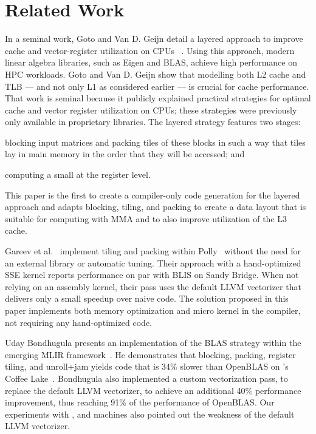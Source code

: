 \documentclass[\main/thesis.tex]{subfiles}
\begin{document}
\chapter{Related Work}
\label{cha:related}


In a seminal work, Goto and Van D. Geijn detail a layered approach to improve cache and vector-register utilization on CPUs ~\cite{goto2008}.
Using this approach, modern linear algebra libraries, such as Eigen and BLAS, achieve high performance on HPC workloads.
Goto and Van D. Geijn show that modelling both L2 cache and TLB --- and not only L1 as considered earlier --- is crucial for cache performance.
That work is seminal because it publicly explained practical strategies for optimal cache and vector register utilization on CPUs; these strategies were previously only available in proprietary libraries.
The layered strategy features two stages:
\begin{inparaenum}
  \item blocking input matrices and packing tiles of these blocks in such a way that tiles lay in main memory in the order that they will be accessed; and
  \item computing a small \gemm at the register level.
\end{inparaenum}
This paper is the first to create a compiler-only code generation for the layered approach and adapts blocking, tiling, and packing to create a data layout that is suitable for computing with MMA and to also improve utilization of the L3 cache.

Gareev et al.~\cite{GareevTACO18} implement tiling and packing within Polly~\cite{polly} without the need for an external library or automatic tuning.
Their approach with a hand-optimized SSE kernel reports performance on par with BLIS on \Intel Sandy Bridge.
When not relying on an assembly kernel, their pass uses the default LLVM vectorizer that delivers only a small speedup over naive code.
The solution proposed in this paper implements both memory optimization and micro kernel in the compiler, not requiring any hand-optimized code.

Uday Bondhugula presents an implementation of the BLAS strategy within the emerging MLIR framework~\cite{uday2020}.
He demonstrates that blocking, packing, register tiling, and unroll+jam yields code that is 34\% slower than OpenBLAS on \Intel's Coffee Lake~\cite{uday2020}.
Bondhugula also implemented a custom vectorization pass, to replace the default LLVM vectorizer, to achieve an additional 40\% performance improvement, thus reaching 91\% of the performance of OpenBLAS.
Our experiments with \Intel, \AMD and \IBM \PowerNine machines also pointed out the weakness of the default LLVM vectorizer.
\end{document}
